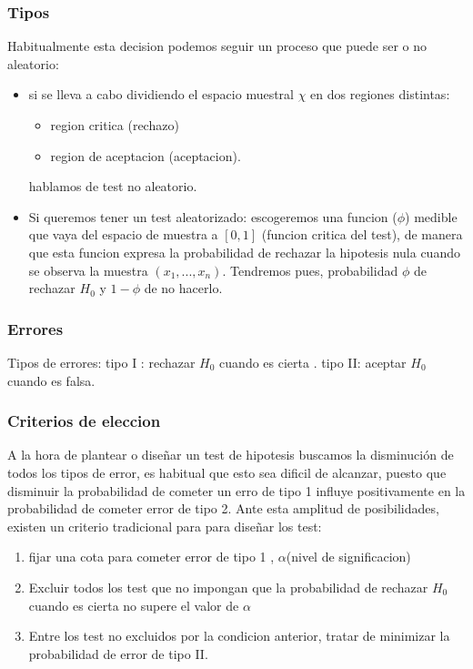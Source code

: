 \documentclass[a4paper,12pt]{article}
\begin{document}
\subsubsection{Tipos}
Habitualmente esta decision podemos seguir un proceso que puede ser o no aleatorio: 
\begin{itemize}
	\item si se lleva a cabo dividiendo el espacio muestral $\chi$ en dos regiones distintas:
	\begin{itemize}
		\item region critica (rechazo)
		\item region de aceptacion (aceptacion).
	\end{itemize} 
	hablamos de test no aleatorio.
	\item Si queremos tener un test aleatorizado: escogeremos una funcion ($\phi$) medible que vaya del espacio de muestra a $[0,1]$ (funcion critica del test), de manera que esta funcion expresa la probabilidad de rechazar la hipotesis nula cuando se observa la muestra $(x_1,...,x_n)$.
	Tendremos pues, probabilidad $\phi$ de rechazar $H_0$ y $1-\phi$ de no hacerlo. 
\end{itemize}

\subsubsection{Errores}

Tipos de errores: tipo I : rechazar $H_0$ cuando es cierta . tipo II: aceptar $H_0$ cuando es falsa.

\subsubsection{Criterios de eleccion}
A la hora de plantear o diseñar un test de hipotesis buscamos la disminución de todos los tipos de error, es habitual que esto sea dificil de alcanzar, puesto que disminuir la probabilidad de cometer un erro de tipo 1 influye positivamente en la probabilidad de cometer error de tipo 2. Ante esta amplitud de posibilidades, existen un criterio tradicional para para diseñar los test:
\begin{enumerate}
	\item fijar una cota para cometer error de tipo 1 , $\alpha$(nivel de significacion)
	\item Excluir todos los test que no impongan que la probabilidad de rechazar $H_0$ cuando es cierta no supere el valor de $\alpha$  
	\item  Entre los test no excluidos por la condicion anterior, tratar de minimizar la probabilidad de error de tipo II.
\end{enumerate}
\end{document}
